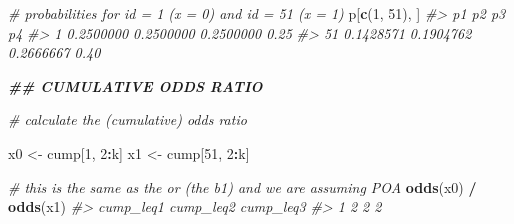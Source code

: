 \documentclass[
  man,floatsintext]{apa6}
\newenvironment{Shaded}{\begin{snugshade}}{\end{snugshade}}
\newcommand{\CommentTok}[1]{\textcolor[rgb]{0.56,0.35,0.01}{\textit{#1}}}
\newcommand{\DecValTok}[1]{\textcolor[rgb]{0.00,0.00,0.81}{#1}}
\newcommand{\DocumentationTok}[1]{\textcolor[rgb]{0.56,0.35,0.01}{\textbf{\textit{#1}}}}
\newcommand{\FunctionTok}[1]{\textcolor[rgb]{0.13,0.29,0.53}{\textbf{#1}}}
\newcommand{\NormalTok}[1]{#1}
\newcommand{\OtherTok}[1]{\textcolor[rgb]{0.56,0.35,0.01}{#1}}
\newcommand{\SpecialCharTok}[1]{\textcolor[rgb]{0.81,0.36,0.00}{\textbf{#1}}}
\begin{document}
\begin{Shaded}
\begin{Highlighting}[]
\CommentTok{\# probabilities for id = 1 (x = 0) and id = 51 (x = 1)}
\NormalTok{p[}\FunctionTok{c}\NormalTok{(}\DecValTok{1}\NormalTok{, }\DecValTok{51}\NormalTok{), ]}
\CommentTok{\#\textgreater{}           p1        p2        p3   p4}
\CommentTok{\#\textgreater{} 1  0.2500000 0.2500000 0.2500000 0.25}
\CommentTok{\#\textgreater{} 51 0.1428571 0.1904762 0.2666667 0.40}

\DocumentationTok{\#\# CUMULATIVE ODDS RATIO}

\CommentTok{\# calculate the (cumulative) odds ratio}

\NormalTok{x0 }\OtherTok{\textless{}{-}}\NormalTok{ cump[}\DecValTok{1}\NormalTok{, }\DecValTok{2}\SpecialCharTok{:}\NormalTok{k]}
\NormalTok{x1 }\OtherTok{\textless{}{-}}\NormalTok{ cump[}\DecValTok{51}\NormalTok{, }\DecValTok{2}\SpecialCharTok{:}\NormalTok{k]}

\CommentTok{\# this is the same as the or (the b1) and we are assuming POA}
\FunctionTok{odds}\NormalTok{(x0) }\SpecialCharTok{/} \FunctionTok{odds}\NormalTok{(x1)}
\CommentTok{\#\textgreater{}   cump\_leq1 cump\_leq2 cump\_leq3}
\CommentTok{\#\textgreater{} 1         2         2         2}
\end{Highlighting}
\end{Shaded}

\normalsize

\scriptsize
\end{document}
